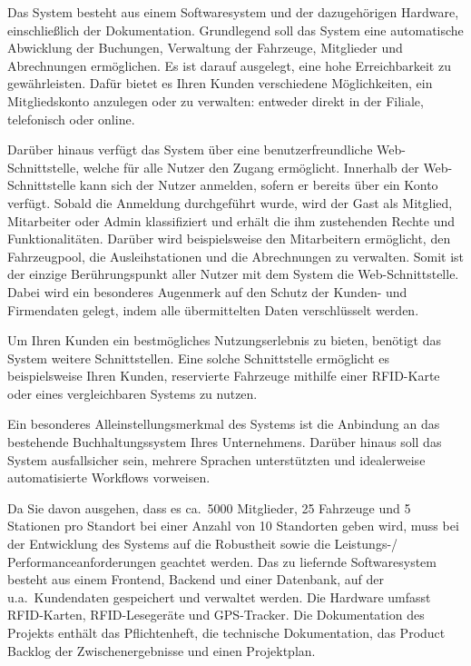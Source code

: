 Das System besteht aus einem Softwaresystem und der dazugehörigen Hardware,
einschließlich der Dokumentation.
Grundlegend soll das System eine automatische Abwicklung der Buchungen,
Verwaltung der Fahrzeuge, Mitglieder und Abrechnungen ermöglichen.
Es ist darauf ausgelegt, eine hohe Erreichbarkeit zu gewährleisten.
Dafür bietet es Ihren Kunden verschiedene Möglichkeiten, ein Mitgliedskonto anzulegen oder zu verwalten:
entweder direkt in der Filiale, telefonisch oder online. \medskip

Darüber hinaus verfügt das System über eine benutzerfreundliche Web-Schnittstelle,
welche für alle Nutzer den Zugang ermöglicht.
Innerhalb der Web-Schnittstelle kann sich der Nutzer anmelden,
sofern er bereits über ein Konto verfügt.
Sobald die Anmeldung durchgeführt wurde, wird der Gast als Mitglied, Mitarbeiter oder Admin
klassifiziert und erhält die ihm zustehenden Rechte und Funktionalitäten.
Darüber wird beispielsweise den Mitarbeitern ermöglicht, den Fahrzeugpool, die Ausleihstationen und die
Abrechnungen zu verwalten.
Somit ist der einzige Berührungspunkt aller Nutzer mit dem System die Web-Schnittstelle.
Dabei wird ein besonderes Augenmerk auf den Schutz der Kunden- und Firmendaten gelegt,
indem alle übermittelten Daten verschlüsselt werden. \medskip

Um Ihren Kunden ein bestmögliches Nutzungserlebnis zu bieten, benötigt das System weitere Schnittstellen.
Eine solche Schnittstelle ermöglicht es beispielsweise Ihren Kunden,
reservierte Fahrzeuge mithilfe einer RFID-Karte oder eines vergleichbaren Systems zu nutzen. \medskip

Ein besonderes Alleinstellungsmerkmal des Systems ist die Anbindung
an das bestehende Buchhaltungssystem Ihres Unternehmens.
Darüber hinaus soll das System ausfallsicher sein,
mehrere Sprachen unterstützten und idealerweise automatisierte Workflows vorweisen. \medskip

Da Sie davon ausgehen, dass es ca.\ 5000 Mitglieder, 25 Fahrzeuge und 5 Stationen pro Standort
bei einer Anzahl von 10 Standorten geben wird, muss bei der Entwicklung des Systems auf die Robustheit
sowie die Leistungs-/ Performanceanforderungen geachtet werden.
Das zu liefernde Softwaresystem besteht aus einem Frontend, Backend und einer Datenbank,
auf der u.a.\ Kundendaten gespeichert und verwaltet werden.
Die Hardware umfasst RFID-Karten, RFID-Lesegeräte und GPS-Tracker.
Die Dokumentation des Projekts enthält das Pflichtenheft, die technische Dokumentation,
das Product Backlog der Zwischenergebnisse und einen Projektplan.